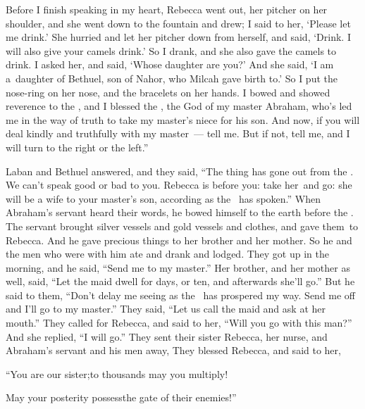\begin{inparaenum}
   Before I finish speaking in my heart, Rebecca went out, her pitcher on her shoulder, and she went down to the fountain and drew; I said to her, `Please let me drink.'%
   She hurried and let her pitcher down from herself, and said, `Drink. I will also give your camels drink.' So I drank, and she also gave the camels to drink.%
   I asked her, and said, `Whose daughter are you?' And she said, `I am a\understood\ daughter of Bethuel, son of Nahor, who Milcah gave birth to.' So I put the nose-ring on her nose, and the bracelets on her hands.%
   I bowed and showed reverence to the \lord, and I blessed the \lord, the God of my master Abraham, who's led me in the way of truth to take my master's niece for his son.%
   And now, if you will deal kindly and truthfully with my master~--- tell me. But if not, tell me, and I will turn to the right or the left.''%
  
   Laban and Bethuel answered, and they said, ``The thing has gone out from the \lord. We can't speak good or bad to you.%
   Rebecca is before you: take her\understood\ and go: she will be a wife to your master's son, according as the \lord\ has spoken.''%
   When Abraham's servant heard their words, he bowed himself to the earth before the \lord.%
   The servant brought silver vessels and gold vessels and clothes, and gave them\understood\ to Rebecca. And he gave precious things to her brother and her mother.%
   So he and the men who were with him ate and drank and lodged. They got up in the morning, and he said, ``Send me to my master.''%
   Her brother, and her mother as well, said, ``Let the maid dwell for days, or ten, and afterwards she'll go.''%
   But he said to them, ``Don't delay me seeing as the \lord\ has prospered my way. Send me off and I'll go to my master.''%
   They said, ``Let us call the maid and ask at her mouth.''%
   They called for Rebecca, and said to her, ``Will you go with this man?'' And she replied, ``I will go.''%
   They sent their sister Rebecca, her nurse, and Abraham's servant and his men away,%
   They blessed Rebecca, and said to her,\smallskip%
  
  \pd ``You are our sister;\pa to thousands may you multiply!%
  
  \pd May your posterity possess\pa the gate of their enemies!''%
  

\end{inparaenum}
